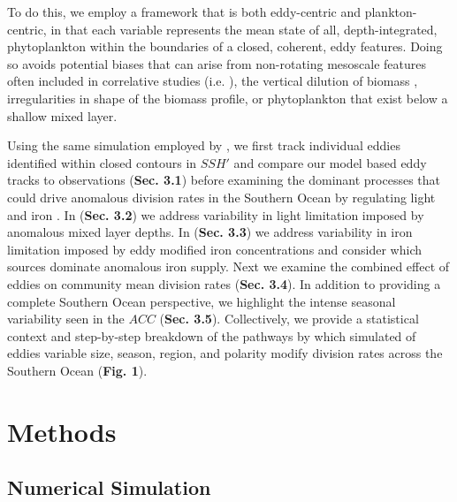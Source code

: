 \documentclass{article}
\begin{document}
To do this, we employ a framework that is both eddy-centric and plankton-centric, in that each variable represents the mean state of all, depth-integrated, phytoplankton within the boundaries of a closed, coherent, eddy features. Doing so avoids potential biases that can arise from non-rotating mesoscale features often included in correlative studies (i.e. \textcite{SongSeasonalvariationcorrelation2018}), the vertical  dilution of biomass \parencite{BehrenfeldAnnualcyclesecological2013}, irregularities in shape of the biomass profile, or phytoplankton that exist below a shallow mixed layer.  

Using the same simulation employed by \textcite{SongSeasonalvariationcorrelation2018}, we first track individual eddies identified within closed contours in $SSH'$ and compare our model based eddy tracks to observations (\textbf{Sec. 3.1}) before examining the dominant processes that could drive anomalous division rates in the Southern Ocean by regulating light \parencite{Fauchereauresponsephytoplanktonbiomass2011} and iron \parencite{BoydEnvironmentalFactorsControlling2002}. In (\textbf{Sec. 3.2}) we address variability in light limitation imposed by anomalous mixed layer depths. In (\textbf{Sec. 3.3}) we address variability in iron limitation imposed by eddy modified iron concentrations and consider which sources dominate anomalous iron supply. Next we examine the combined effect of eddies on community mean division rates (\textbf{Sec. 3.4}). In addition to providing a complete Southern Ocean perspective, we highlight the intense seasonal variability seen in the $ACC$ (\textbf{Sec. 3.5}).  Collectively, we provide a statistical context and step-by-step breakdown of the pathways by which simulated of eddies variable size, season, region, and polarity modify division rates across the Southern Ocean (\textbf{Fig. 1}).




\section{Methods}


\subsection{Numerical Simulation}
\end{document}
